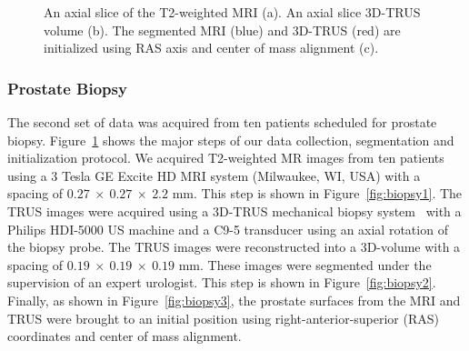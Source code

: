 \documentclass[journal]{IEEEtran}
\begin{document}
\begin{figure}[t]
	\centering
	 \hfill
	 \hfill
  \caption{An axial slice of the T2-weighted MRI (a). An axial slice 3D-TRUS volume (b). The segmented MRI (blue) and 3D-TRUS (red) are initialized using RAS axis and center of mass alignment (c). \label{fig:biopsy}}
\end{figure}
\subsubsection{Prostate Biopsy}\label{sec:data2}
The second set of data was acquired from ten patients scheduled for prostate biopsy. Figure~\ref{fig:biopsy} shows the major steps of our data collection, segmentation and initialization protocol. We acquired T2-weighted MR images from ten patients using a 3 Tesla GE Excite HD MRI system (Milwaukee, WI, USA) with a spacing of $0.27~\times~0.27~\times~2.2$ mm. This step is shown in Figure~\ref{fig:biopsy1}. The TRUS images were acquired using a 3D-TRUS mechanical biopsy system~\cite{Bax08a} with a Philips HDI-5000 US machine and a C9-5 transducer using an axial rotation of the biopsy probe. The TRUS images were reconstructed into a 3D-volume with a spacing of $0.19~\times~0.19~\times~0.19$ mm. These images were segmented under the supervision of an expert urologist. This step is shown in Figure~\ref{fig:biopsy2}. Finally, as shown in Figure~\ref{fig:biopsy3}, the prostate surfaces from the MRI and TRUS were brought to an initial position using right-anterior-superior (RAS) coordinates and center of mass alignment.
\end{document}
